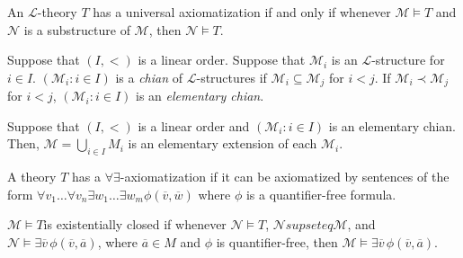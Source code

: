 \documentclass[
	fontsize=10pt, %
]{kaohandt}
\begin{document}
\begin{theorem}
    An $\mathcal{L}$-theory $T$ has a universal axiomatization if and only if 
    whenever $\mathcal{M} \models T$ and $\mathcal{N}$ is a substructure of $\mathcal{M}$,
    then $\mathcal{N} \models T$.
\end{theorem}

\begin{definition}
    Suppose that $(I,<)$ is a linear order.
    Suppose that $\mathcal{M}_i$ is an $\mathcal{L}$-structure for $i \in I$.
    $(\mathcal{M}_i: i \in I)$ is a \emph{chian} of $\mathcal{L}$-structures if $\mathcal{M}_i \subseteq \mathcal{M}_j$ for $i < j$.
    If $\mathcal{M}_i \prec \mathcal{M}_j$ for $i < j$,
    $(\mathcal{M}_i: i \in I)$ is an \emph{elementary chian}.
\end{definition}

\begin{proposition}
    Suppose that $(I,<)$ is a linear order and 
    $(\mathcal{M}_i: i \in I)$ is an elementary chian.
    Then, $\mathcal{M} = \bigcup_{i\in I} M_i$ is an elementary extension of each $\mathcal{M}_i$.
\end{proposition}

\begin{definition}
    A theory $T$ has a $\forall\exists$-axiomatization if it can be axiomatized by sentences of the form $\forall v_1\dots\forall v_n \exists w_1\dots \exists w_m \phi(\overline{v},\overline{w})$ 
    where $\phi$ is a quantifier-free formula.
\end{definition}

\begin{definition}
    $\mathcal{M} \models T$is existentially closed 
    if whenever $\mathcal{N} \models T$, $\mathcal{N} supseteq \mathcal{M}$, 
    and $\mathcal{N} \models \exists \overline{v}\, \phi(\overline{v},\overline{a})$, 
    where $\overline{a} \in M$ and $\phi$ is quantifier-free,
    then $\mathcal{M} \models \exists \overline{v} \, \phi(\overline{v},\overline{a})$.
\end{definition}
\end{document}
